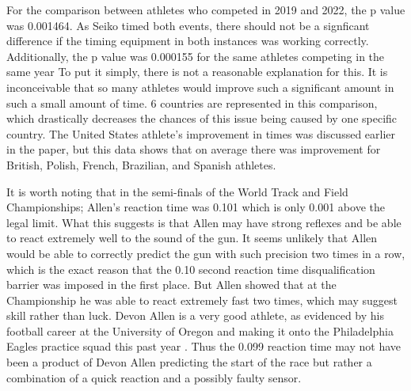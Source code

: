 \documentclass[12pt, letterpaper, titlepage]{article}
\begin{document}


For the comparison between athletes who competed in 2019 and 2022, the p value
was 0.001464.  As Seiko timed both events, there should not be a signficant
difference if the timing equipment in both instances was working correctly.
Additionally, the p value was 0.000155 for the same athletes competing in the 
same year  To put it simply, there is not a reasonable explanation for 
this. It is inconceivable that so many athletes would improve such a significant
amount in such a small amount of time. 6 countries are represented in this 
comparison, which drastically decreases the chances of this issue being caused by
one specific country.  The United States athlete's improvement in times was
discussed earlier in the paper, but this data shows that on average there was
improvement for British, Polish, French, Brazilian, and Spanish athletes.


It is worth noting that in the semi-finals of the World Track and
Field Championships; Allen's reaction time was 0.101 which is only 0.001 above
the legal limit.  What this suggests is that Allen may have strong reflexes
and be able to react extremely well to the sound of the gun.  It seems unlikely that
Allen would be able to correctly predict the gun with such precision two times in a row,
which is the exact reason that the 0.10 second reaction time disqualification barrier was
imposed in the first place.  But Allen showed that at the Championship he was able to
react extremely fast two times, which may suggest skill rather than luck. Devon 
Allen is a very good athlete, as evidenced by his football career at the University of Oregon
and making it onto the Philadelphia Eagles practice squad this past year \citep{Hurley}.
Thus the 0.099 reaction time may not have been a product of Devon Allen
predicting the start of the race but rather a combination of a quick reaction 
and a possibly faulty sensor.
\end{document}
